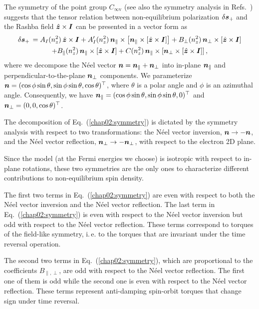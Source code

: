 The symmetry of the point group $C_{\infty\textrm{v}}$ (see also the symmetry analysis in Refs.~\cite{vanderBijl2012, garello_symmetry_2013}) suggests that the tensor relation between non-equilibrium polarization $\delta\boldsymbol{s}_+$ and the Rashba field $\hat{\boldsymbol{z}}\times \boldsymbol{I}$ can be presented in a vector form as 
\begin{multline}
\delta\boldsymbol{s}_+\,= A_I(n_z^2)\,\hat{\boldsymbol{z}}\times \boldsymbol{I} + A'_I(n_z^2)\,\boldsymbol{n}_\parallel\times \left[\boldsymbol{n}_\parallel\times \left[\hat{\boldsymbol{z}}\times \boldsymbol{I}\right]\right]
+ B_\perp(n_z^2)\,\boldsymbol{n}_\perp\times \left[\hat{\boldsymbol{z}}\times \boldsymbol{I}\right]\\
+B_\parallel(n_z^2)\,\boldsymbol{n}_\parallel\times \left[\hat{\boldsymbol{z}}\times \boldsymbol{I}\right]+ C(n_z^2)\,\boldsymbol{n}_\parallel\times \left[\boldsymbol{n}_\perp\times \left[\hat{\boldsymbol{z}}\times \boldsymbol{I}\right]\right],
\label{chap02:symmetry}
\end{multline}
where we decompose the N\'eel vector $\boldsymbol{n}=\boldsymbol{n}_\parallel+\boldsymbol{n}_\perp$ into in-plane $\boldsymbol{n}_\parallel$ and perpendicular-to-the-plane $\boldsymbol{n}_\perp$ components. We parameterize $\boldsymbol{n}=(\cos\phi\sin\theta,\allowbreak \sin\phi\sin\theta, \allowbreak \cos\theta)^\top$, where $\theta$ is a polar angle and $\phi$ is an azimuthal angle. Consequently, we have $\boldsymbol{n}_\parallel=(\cos\phi\sin\theta,\sin\phi\sin\theta,0)^\top$ and $\boldsymbol{n}_\perp=(0,0,\cos\theta)^\top$.

The decomposition of Eq.~(\ref{chap02:symmetry}) is dictated by the symmetry analysis with respect to two transformations: the N\'eel vector inversion, $\boldsymbol{n}\to -\boldsymbol{n}$, and the N\'eel vector reflection, $\boldsymbol{n}_\perp\to -\boldsymbol{n}_\perp$, with respect to the electron 2D plane. 

Since the model (at the Fermi energies we choose) is isotropic with respect to in-plane rotations, these two symmetries are the only ones to characterize different contributions to non-equilibrium spin density. 

The first two terms in Eq.~(\ref{chap02:symmetry}) are even with respect to both the N\'eel vector inversion and the N\'eel vector reflection. The last term in Eq.~(\ref{chap02:symmetry}) is even with respect to the N\'eel vector inversion but odd with respect to the N\'eel vector reflection. These terms correspond to torques of the field-like symmetry, i.\,e. to the torques that are invariant under the time reversal operation. 

The second two terms in Eq.~(\ref{chap02:symmetry}), which are proportional to the coefficients $B_{\parallel,\perp}$, are odd with respect to the N\'eel vector reflection. The first one of them is odd while the second one is even with respect to the N\'eel vector reflection. These terms represent anti-damping spin-orbit torques that change sign under time reversal.

